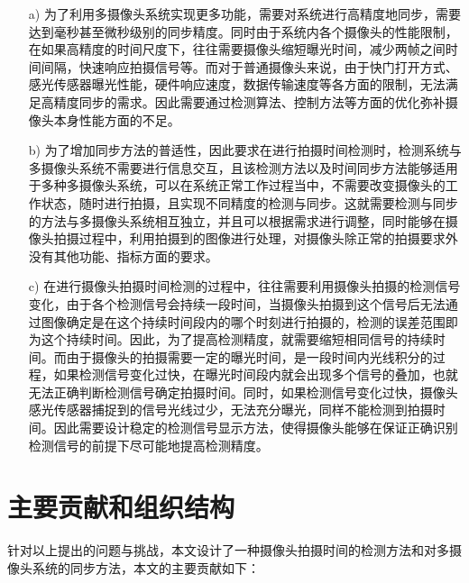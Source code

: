 \begin{itemize}

\item[a)] 为了利用多摄像头系统实现更多功能，需要对系统进行高精度地同步，需要达到毫秒甚至微秒级别的同步精度。同时由于系统内各个摄像头的性能限制，在如果高精度的时间尺度下，往往需要摄像头缩短曝光时间，减少两帧之间时间间隔，快速响应拍摄信号等。而对于普通摄像头来说，由于快门打开方式、感光传感器曝光性能，硬件响应速度，数据传输速度等各方面的限制，无法满足高精度同步的需求。因此需要通过检测算法、控制方法等方面的优化弥补摄像头本身性能方面的不足。

\item[b)]为了增加同步方法的普适性，因此要求在进行拍摄时间检测时，检测系统与多摄像头系统不需要进行信息交互，且该检测方法以及时间同步方法能够适用于多种多摄像头系统，可以在系统正常工作过程当中，不需要改变摄像头的工作状态，随时进行拍摄，且实现不同精度的检测与同步。这就需要检测与同步的方法与多摄像头系统相互独立，并且可以根据需求进行调整，同时能够在摄像头拍摄过程中，利用拍摄到的图像进行处理，对摄像头除正常的拍摄要求外没有其他功能、指标方面的要求。

\item[c)]在进行摄像头拍摄时间检测的过程中，往往需要利用摄像头拍摄的检测信号变化，由于各个检测信号会持续一段时间，当摄像头拍摄到这个信号后无法通过图像确定是在这个持续时间段内的哪个时刻进行拍摄的，检测的误差范围即为这个持续时间。因此，为了提高检测精度，就需要缩短相同信号的持续时间。而由于摄像头的拍摄需要一定的曝光时间，是一段时间内光线积分的过程，如果检测信号变化过快，在曝光时间段内就会出现多个信号的叠加，也就无法正确判断检测信号确定拍摄时间。同时，如果检测信号变化过快，摄像头感光传感器捕捉到的信号光线过少，无法充分曝光，同样不能检测到拍摄时间。因此需要设计稳定的检测信号显示方法，使得摄像头能够在保证正确识别检测信号的前提下尽可能地提高检测精度。

\end{itemize}

\section{主要贡献和组织结构}

针对以上提出的问题与挑战，本文设计了一种摄像头拍摄时间的检测方法和对多摄像头系统的同步方法，本文的主要贡献如下：

